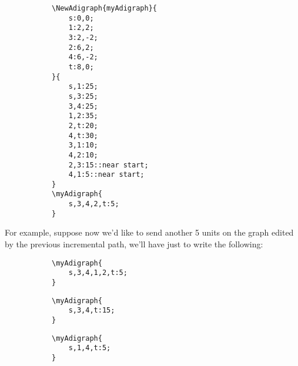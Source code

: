 \documentclass{report}
\begin{document}
\begin{figure}
	\begin{subfigure}{0.49\textwidth}
		\begin{verbatim}
\NewAdigraph{myAdigraph}{
	s:0,0;
	1:2,2;
	3:2,-2;
	2:6,2;
	4:6,-2;
	t:8,0;
}{
	s,1:25;
	s,3:25;
	3,4:25;
	1,2:35;
	2,t:20;
	4,t:30;
	3,1:10;
	4,2:10;
	2,3:15::near start;
	4,1:5::near start;
}
\myAdigraph{
	s,3,4,2,t:5;
}
\end{verbatim}
	\end{subfigure}
	\begin{subfigure}{0.49\textwidth}
	\end{subfigure}
\end{figure}

For example, suppose now we'd like to send another 5 units on the graph edited by the previous incremental path, we'll have just to write the following:

\begin{figure}
	\begin{subfigure}{0.49\textwidth}
		\begin{verbatim}
\myAdigraph{
	s,3,4,1,2,t:5;
}
\end{verbatim}
	\end{subfigure}
	\begin{subfigure}{0.49\textwidth}
	\end{subfigure}
\end{figure}

\begin{figure}
	\begin{subfigure}{0.49\textwidth}
		\begin{verbatim}
\myAdigraph{
	s,3,4,t:15;
}
\end{verbatim}
	\end{subfigure}
	\begin{subfigure}{0.49\textwidth}
	\end{subfigure}
\end{figure}

\begin{figure}
	\begin{subfigure}{0.49\textwidth}
		\begin{verbatim}
\myAdigraph{
	s,1,4,t:5;
}
\end{verbatim}
	\end{subfigure}
	\begin{subfigure}{0.49\textwidth}
	\end{subfigure}
\end{figure}
\end{document}
